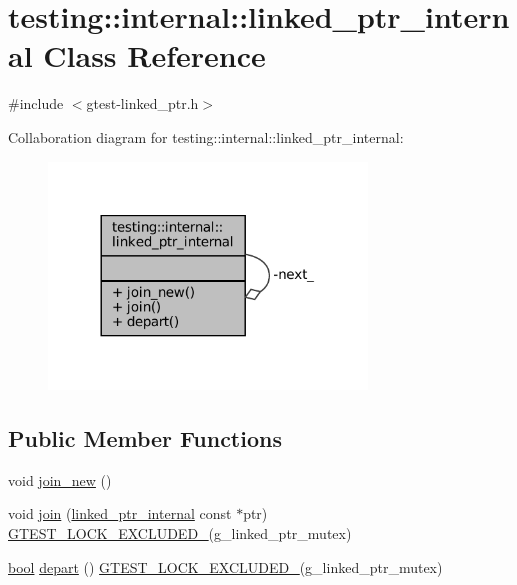 \hypertarget{classtesting_1_1internal_1_1linked__ptr__internal}{}\section{testing\+:\+:internal\+:\+:linked\+\_\+ptr\+\_\+internal Class Reference}
\label{classtesting_1_1internal_1_1linked__ptr__internal}


{\ttfamily \#include $<$gtest-\/linked\+\_\+ptr.\+h$>$}



Collaboration diagram for testing\+:\+:internal\+:\+:linked\+\_\+ptr\+\_\+internal\+:
\nopagebreak
\begin{figure}[H]
\begin{center}
\leavevmode
\includegraphics[width=240pt]{classtesting_1_1internal_1_1linked__ptr__internal__coll__graph}
\end{center}
\end{figure}
\subsection*{Public Member Functions}
\begin{DoxyCompactItemize}
\item 
void \hyperlink{classtesting_1_1internal_1_1linked__ptr__internal_a742af1f65df2d5e2b7198a1b74264a83}{join\+\_\+new} ()
\item 
void \hyperlink{classtesting_1_1internal_1_1linked__ptr__internal_acd5a341459f7e81b10b4112d8c764e2a}{join} (\hyperlink{classtesting_1_1internal_1_1linked__ptr__internal}{linked\+\_\+ptr\+\_\+internal} const $\ast$ptr) \hyperlink{gtest-port_8h_a69abff5a4efdd07bd5faebe3dd318d06}{G\+T\+E\+S\+T\+\_\+\+L\+O\+C\+K\+\_\+\+E\+X\+C\+L\+U\+D\+E\+D\+\_\+}(g\+\_\+linked\+\_\+ptr\+\_\+mutex)
\item 
\hyperlink{classbool}{bool} \hyperlink{classtesting_1_1internal_1_1linked__ptr__internal_a8699e539d9702d363ef0351012d1b3ca}{depart} () \hyperlink{gtest-port_8h_a69abff5a4efdd07bd5faebe3dd318d06}{G\+T\+E\+S\+T\+\_\+\+L\+O\+C\+K\+\_\+\+E\+X\+C\+L\+U\+D\+E\+D\+\_\+}(g\+\_\+linked\+\_\+ptr\+\_\+mutex)
\end{DoxyCompactItemize}
